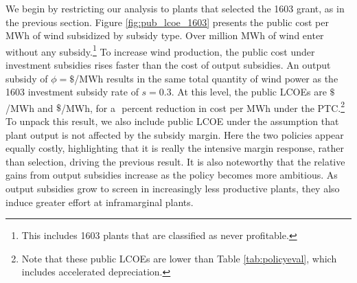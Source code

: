 \documentclass[12pt]{article}
\begin{document}
We begin by restricting our analysis to plants that selected the 1603 grant, as in the previous section. Figure \ref{fig:pub_lcoe_1603} presents the public cost per MWh of wind subsidized by subsidy type. Over  \unskip million MWh of wind enter without any subsidy.\footnote{This includes 1603 plants that are classified as never profitable.} To increase wind production, the public cost under investment subsidies rises faster than the cost of output subsidies. An output subsidy of $\phi = \$ $/MWh results in the same total quantity of wind power as the 1603 investment subsidy rate of $s=0.3$. At this level, the public LCOEs are $\$ $/MWh and $\$ $/MWh, for a $$ percent reduction in cost per MWh under the PTC.\footnote{Note that these public LCOEs are lower than Table \ref{tab:policyeval}, which includes accelerated depreciation.} To unpack this result, we also include public LCOE under the assumption that plant output is not affected by the subsidy margin. Here the two policies appear equally costly, highlighting that it is really the intensive margin response, rather than selection, driving the previous result. It is also noteworthy that the relative gains from output subsidies increase as the policy becomes more ambitious. As output subsidies grow to screen in increasingly less productive plants, they also induce greater effort at inframarginal plants. 
\end{document}

